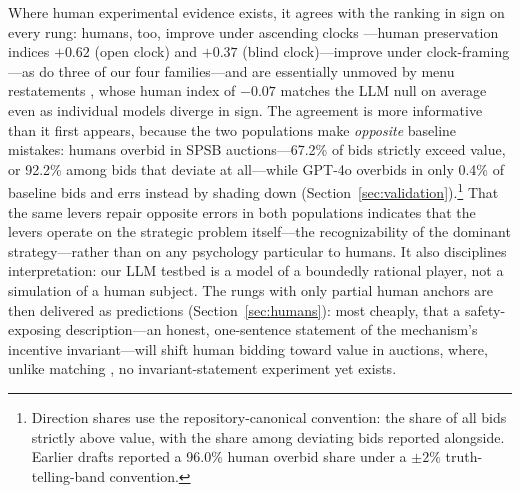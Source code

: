 Where human experimental evidence exists, it agrees with the ranking in sign on every rung: humans, too, improve under ascending clocks \citep{li2017obviously}---human preservation indices $+0.62$ (open clock) and $+0.37$ (blind clock)---improve under clock-framing \citep{breitmoser2022obviousness}---as do three of our four families---and are essentially unmoved by menu restatements \citep{gonczarowski2024describing}, whose human index of $-0.07$ matches the LLM null on average even as individual models diverge in sign. The agreement is more informative than it first appears, because the two populations make \emph{opposite} baseline mistakes: humans overbid in SPSB auctions---67.2\% of bids strictly exceed value, or 92.2\% among bids that deviate at all---while GPT-4o overbids in only 0.4\% of baseline bids and errs instead by shading down (Section~\ref{sec:validation}).\footnote{Direction shares use the repository-canonical convention: the share of all bids strictly above value, with the share among deviating bids reported alongside. Earlier drafts reported a 96.0\% human overbid share under a $\pm2\%$ truth-telling-band convention.} That the same levers repair opposite errors in both populations indicates that the levers operate on the strategic problem itself---the recognizability of the dominant strategy---rather than on any psychology particular to humans. It also disciplines interpretation: our LLM testbed is a model of a boundedly rational player, not a simulation of a human subject. The rungs with only partial human anchors are then delivered as predictions (Section~\ref{sec:humans}): most cheaply, that a safety-exposing description---an honest, one-sentence statement of the mechanism's incentive invariant---will shift human bidding toward value in auctions, where, unlike matching \citep{gonczarowski2024describing, katuscak2024simpler}, no invariant-statement experiment yet exists.

